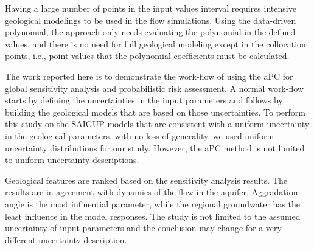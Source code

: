 {Having a large number of points in the input values interval requires
intensive geological modelings to be used in the flow simulations. Using the
data-driven polynomial, the approach only needs evaluating the polynomial in the
defined values, and there is no need for full geological modeling except in
the collocation points, i.e., point values that the polynomial coefficients must
be calculated. 

The work reported here is to demonstrate the work-flow of using the aPC for
global sensitivity analysis and probabilistic risk assessment. A normal
work-flow starts by defining the uncertainties in the input parameters and
follows by building the geological models that are based on those uncertainties.
To perform this study on the SAIGUP models that are consistent
with a uniform uncertainty in the geological parameters, with no loss of
generality, we used uniform uncertainty distributions for our study. However,
the aPC method is not limited to uniform uncertainty descriptions.

Geological features are ranked based on the sensitivity analysis results. The
results are in agreement with dynamics of the flow in the aquifer. Aggradation
angle is the most influential parameter, while the regional groundwater has the
least influence in the model responses. The study is not limited to the assumed
uncertainty of input parameters and the conclusion may change for a very
different uncertainty description. 

}
